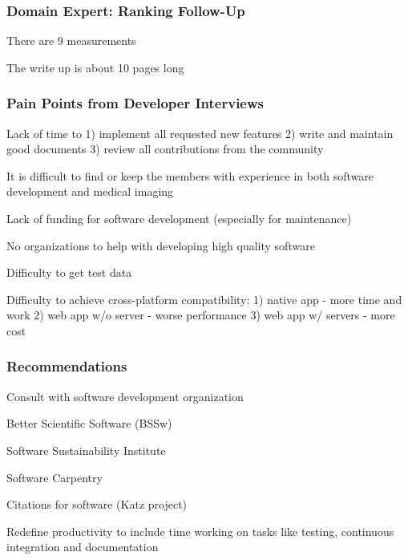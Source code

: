 \documentclass[t,12pt,numbers,fleqn]{beamer}
\begin{document}

\begin{frame}
\frametitle{Domain Expert: Ranking Follow-Up}

\bi
\item {}
\bi
\item There are 9 measurements
\item The write up is about 10 pages long \ei \ei

\end{frame}


\begin{frame}
\frametitle{Pain Points from Developer Interviews}

\bi
\item Lack of time to 1) implement all requested new features 2) write and maintain good documents 3) review all contributions from the community
\item It is difficult to find or keep the members with experience in both software development and medical imaging
\item Lack of funding for software development (especially for maintenance)
\item No organizations to help with developing high quality software
\item Difficulty to get test data
\item Difficulty to achieve cross-platform compatibility: 1) native app - more time and work 2) web app w/o server - worse performance 3) web app w/ servers - more cost
\ei

\end{frame}


\begin{frame}
\frametitle{Recommendations}

\bi
\item Consult with software development organization
  \bi
\item Better Scientific Software (BSSw)
\item Software Sustainability Institute
\item Software Carpentry
  \ei
\item Citations for software (Katz project)
  \item Redefine productivity to include time working on tasks like testing, continuous
    integration and documentation
\ei

\end{frame}
\end{document}
